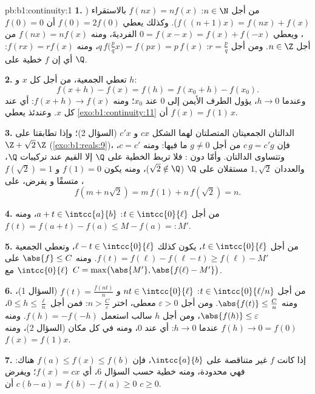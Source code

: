 \begin{solution}{pb:b1:continuity:1}
\textbf{1.} من أجل $n \in \N$: $f(nx) = n f(x)$ بالاستقراء
($f((n+1)x) = f(nx) + f(x)$). وكذلك يعطي $f(0) = 2f(0)$ أن $f(0) =
0$، ويعطي $0 = f(x - x) = f(x) + f(-x)$ الفرديةَ، ومنه $f(nx) =
nf(x)$ من أجل $n \in \Z$. ومن أجل $r = \frac pq$: $q\,f\bigl(\tfrac
pq x\bigr) = f(px) = p\,f(x)$، ومنه $f(rx) = r f(x)$: أي إن $f$
خطية على $\Q$.

\textbf{2.} تعطي الجمعية، من أجل كل $x$ و $h$:
\[
f(x + h) - f(x) = f(h) = f(x_0 + h) - f(x_0) .
\]
وعندما $h \to 0$، يؤول الطرف الأيمن إلى $0$  عند
$x_0$؛ ومنه $f(x + h) \to f(x)$: أي  عند كل $x$. وعندئذ
يعطي \cref{exo:b1:continuity:11} أن $f(x) = f(1)\,x$.

\textbf{3.} الدالتان الجمعيتان المتصلتان لهما الشكل
$cx$ و $c'x$ (السؤال 2)؛ وإذا تطابقتا على  
$\Z + \sqrt2\,\Z$ (\cref{exo:b1:reals:9})، فإن $c\,g = c'g$ من أجل
$g \neq 0$ ما فيها: ومنه $c = c'$، وتتساوى الدالتان. وأمّا دون
: فلا تربط الخطية على $\Q$ إلا القيم عند
تركيبات $\Q$، والعددان $1, \sqrt2$ مستقلان على $\Q$ ($\sqrt2
\notin \Q$)، ومنه يكون $f(1) = 0$ و $f(\sqrt2) = 1$ متسقًا و
يفرض، على ،
\[
f(m + n\sqrt2) = m\,f(1) + n\,f(\sqrt2) = n .
\]

\textbf{4.} من أجل $t \in \intcc{0}{\ell}$: $a + t \in
\intcc{a}{b}$، ومنه $f(t) = f(a + t) - f(a) \leq M - f(a) =: M'$.

\textbf{5.} من أجل $t \in \intcc{0}{\ell}$، يكون كذلك $\ell - t \in
\intcc{0}{\ell}$، وتعطي الجمعية $f(t) = f(\ell) - f(\ell
- t) \geq f(\ell) - M'$. ومنه $\abs{f} \leq C$ على
$\intcc{0}{\ell}$ مع $C = \max\bigl(\abs{M'}, \abs{f(\ell) -
M'}\bigr)$.

\textbf{6.} من أجل $t \in \intcc{0}{\ell/n}$: $nt \in
\intcc{0}{\ell}$ و $f(t) = \frac{f(nt)}{n}$ (السؤال 1)، ومنه
$\abs{f(t)} \leq \frac Cn$. ومن أجل $\varepsilon > 0$ معطى، اختر $n >
\frac C\varepsilon$: فمن أجل $0 \leq h \leq \frac\ell n$،
$\abs{f(h)} \leq \varepsilon$، ومن أجل $h$ سالب استعمل $f(h) =
-f(-h)$. ومنه $f(h) \to 0 = f(0)$ عندما $h \to 0$: أي  عند $0$،
ومنه في كل مكان (السؤال 2)، ومنه $f(x) = f(1)x$.

\textbf{7.} إذا كانت $f$ غير متناقصة على $\intcc{a}{b}$، فإن
$f(a) \leq f(x) \leq f(b)$ هناك: فهي محدودة، ومنه خطية حسب السؤال
6، أي $f(x) = cx$؛ ويفرض $c(b - a) = f(b) - f(a) \geq 0$ أن $c
\geq 0$.


\end{solution}
